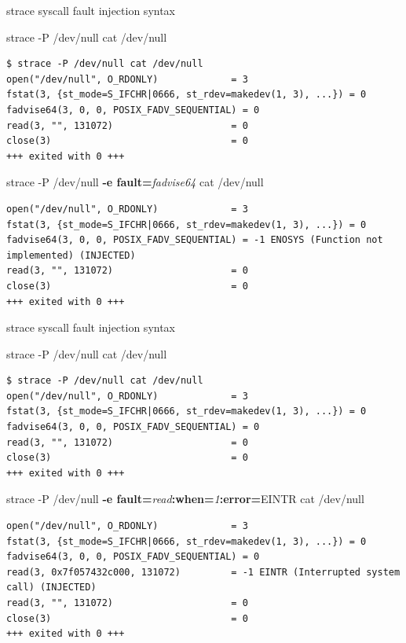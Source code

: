 \documentclass[unicode,aspectratio=169]{beamer}
\begin{document}
\begin{frame}[fragile]{strace syscall fault injection syntax}
\scriptsize
\begin{block}{\large strace -P /dev/null cat /dev/null}
\begin{verbatim}
$ strace -P /dev/null cat /dev/null
open("/dev/null", O_RDONLY)             = 3
fstat(3, {st_mode=S_IFCHR|0666, st_rdev=makedev(1, 3), ...}) = 0
fadvise64(3, 0, 0, POSIX_FADV_SEQUENTIAL) = 0
read(3, "", 131072)                     = 0
close(3)                                = 0
+++ exited with 0 +++
\end{verbatim}
\end{block}
\begin{block}{\large strace -P /dev/null {\bf -e fault=}{\it fadvise64} cat /dev/null}
\begin{verbatim}
open("/dev/null", O_RDONLY)             = 3
fstat(3, {st_mode=S_IFCHR|0666, st_rdev=makedev(1, 3), ...}) = 0
fadvise64(3, 0, 0, POSIX_FADV_SEQUENTIAL) = -1 ENOSYS (Function not implemented) (INJECTED)
read(3, "", 131072)                     = 0
close(3)                                = 0
+++ exited with 0 +++
\end{verbatim}
\end{block}
\end{frame}

\begin{frame}[fragile]{strace syscall fault injection syntax}
\scriptsize
\begin{block}{\large strace -P /dev/null cat /dev/null}
\begin{verbatim}
$ strace -P /dev/null cat /dev/null
open("/dev/null", O_RDONLY)             = 3
fstat(3, {st_mode=S_IFCHR|0666, st_rdev=makedev(1, 3), ...}) = 0
fadvise64(3, 0, 0, POSIX_FADV_SEQUENTIAL) = 0
read(3, "", 131072)                     = 0
close(3)                                = 0
+++ exited with 0 +++
\end{verbatim}
\end{block}
\begin{block}{\large strace -P /dev/null {\bf -e fault=}{\it read}{\bf :when=}{\it 1}{\bf :error=}{\sc EINTR} cat /dev/null}
\begin{verbatim}
open("/dev/null", O_RDONLY)             = 3
fstat(3, {st_mode=S_IFCHR|0666, st_rdev=makedev(1, 3), ...}) = 0
fadvise64(3, 0, 0, POSIX_FADV_SEQUENTIAL) = 0
read(3, 0x7f057432c000, 131072)         = -1 EINTR (Interrupted system call) (INJECTED)
read(3, "", 131072)                     = 0
close(3)                                = 0
+++ exited with 0 +++
\end{verbatim}
\end{block}
\end{frame}
\end{document}
